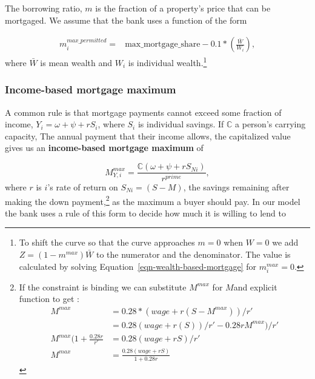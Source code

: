 {The borrowing ratio, $m$ is the fraction of a property's price that can be mortgaged. We assume that the bank uses a function of the form 


\begin{align}
m_i^{max\_permitted} =& \mathrm{max\_mortgage\_share} - 0.1*\left(\frac{\bar W}{ W_i}\right), \label{eqn-wealth-based-mortgage}  %
\end{align} 
where $\bar{W}$ is mean wealth and $W_i$ is individual wealth.\footnote{To shift the curve  so that the curve approaches $m=0$ when $W=0$ we add  $Z=(1-m^{max})\bar W$ to the numerator and the denominator. The value is calculated by solving Equation~\ref{eqn-wealth-based-mortgage} for {$m_i^{max}=0$}.}


\subsubsection{Income-based mortgage maximum}
A common rule is that mortgage payments cannot exceed some fraction of income, $Y_i=\omega+ \psi + {r}S_i$, where $S_i$ is individual savings.
If $\mathbb{C}$ a person's carrying capacity, The annual payment that their income allows,  the capitalized value gives us an \textbf{income-based  mortgage maximum} of 


\begin{equation}
M^{max}_{Y,i} = \frac{\mathbb{C} (\omega+ \psi + {r}S_{Ni})}{r^{prime}},\label{eqn-income-based-mortgage}    
\end{equation}
where ${r}$ is $i$'s rate of return on  $S_{Ni}=(S-M)$, the savings remaining after making the down payment,\footnote{If the constraint is binding we can  substitute $M^{max}$ for $M$and explicit function to get :
\begin{align}
M^{max}      &= 0.28 * (wage + r (S-M^{max})) / r'\nonumber\\
         &= 0.28 (wage + r (S)) / r' - 0.28 rM^{max}) / r'\nonumber\\
M^{max}(1+\frac{0.28 r}{r'}&=0.28 (wage + r S) / r'\nonumber\\
M^{max}   &=  \frac{0.28 (wage + r S )} {1+0.28 r}\nonumber   
\end{align}
} as the maximum a  buyer should pay. %
In our model the bank uses a rule of this form to decide how much it is willing to lend to 

}
